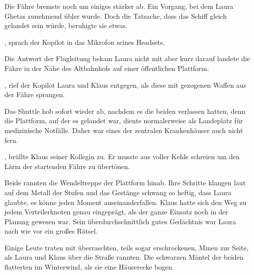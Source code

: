 \par

Die Fähre bremste noch um einiges stärker ab. Ein Vorgang, bei dem Laura Ghetas zunehmend übler wurde. Doch die Tatsache, dass das Schiff gleich gelandet sein würde, beruhigte sie etwas.

\par

, sprach der Kopilot in das Mikrofon seines Headsets.

\par

Die Antwort der Flugleitung bekam Laura nicht mit aber kurz darauf landete die Fähre in der Nähe des Altbahnhofs auf einer öffentlichen Plattform.

\par

, rief der Kopilot Laura und Klaus entgegen, als diese mit gezogenen Waffen aus der Fähre sprangen.

\par

Das Shuttle hob sofort wieder ab, nachdem es die beiden verlassen hatten, denn die Plattform, auf der es gelandet war, diente normalerweise als Landeplatz für medizinische Notfälle. Daher war eines der zentralen Krankenhäuser auch nicht fern.

\par

, brüllte Klaus seiner Kollegin zu. Er musste aus voller Kehle schreien um den Lärm der startenden Fähre zu übertönen.

\par

Beide rannten die Wendeltreppe der Plattform hinab. Ihre Schritte klangen laut auf dem Metall der Stufen und das Gestänge schwang so heftig, dass Laura glaubte, es könne jeden Moment auseinanderfallen. Klaus hatte sich den Weg zu jedem Verteilerknoten genau eingeprägt, als der ganze Einsatz noch in der Planung gewesen war. Sein überdurchschnittlich gutes Gedächtnis war Laura nach wie vor ein großes Rätsel.

\par

Einige Leute traten mit überraschten, teils sogar erschrockenen, Minen zur Seite, als Laura und Klaus über die Straße rannten. Die schwarzen Mäntel der beiden flatterten im Winterwind, als sie eine Häuserecke bogen.

